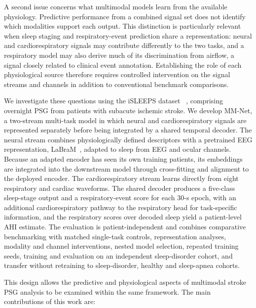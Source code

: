 \documentclass{ieeeaccess}
\begin{document}
A second issue concerns what multimodal models learn from the available
physiology. Predictive performance from a combined signal set does not identify
which modalities support each output. This distinction is particularly relevant
when sleep staging and respiratory-event prediction share a representation:
neural and cardiorespiratory signals may contribute differently to the two tasks,
and a respiratory model may also derive much of its discrimination from airflow,
a signal closely related to clinical event annotation. Establishing the role of
each physiological source therefore requires controlled intervention on the
signal streams and channels in addition to conventional benchmark comparisons.

We investigate these questions using the iSLEEPS dataset
~\cite{maiti2026isleeps}, comprising overnight PSG from patients with subacute
ischemic stroke. We develop MM-Net, a two-stream multi-task model in which neural
and cardiorespiratory signals are represented separately before being integrated
by a shared temporal decoder. The neural stream combines physiologically defined
descriptors with a pretrained EEG representation, LaBraM~\cite{labram2024},
adapted to sleep from EEG and ocular channels. Because an adapted encoder has seen
its own training patients, its embeddings are integrated into the downstream
model through cross-fitting and alignment to the deployed encoder. The
cardiorespiratory stream learns directly from eight respiratory and cardiac
waveforms. The shared decoder produces a five-class sleep-stage output and a
respiratory-event score for each 30-s epoch, with an additional
cardiorespiratory pathway to the respiratory head for task-specific information,
and the respiratory scores over decoded sleep yield a patient-level AHI estimate.
The evaluation is patient-independent and combines comparative benchmarking with
matched single-task controls, representation analyses, modality and channel
interventions, nested model selection, repeated training seeds, training and
evaluation on an independent sleep-disorder cohort, and transfer without
retraining to sleep-disorder, healthy and sleep-apnea cohorts.

This design allows the predictive and physiological aspects of multimodal stroke
PSG analysis to be examined within the same framework. The main contributions of
this work are:
\end{document}
